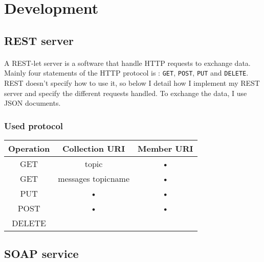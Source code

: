 \section{Development}

\subsection{REST server}

\paragraph{}{
	A REST-let server is a software that handle HTTP requests to exchange data. Mainly four
 statements of the HTTP protocol is : \texttt{GET}, \texttt{POST}, \texttt{PUT} and
 \texttt{DELETE}. REST doesn't specify how to use it, so below I detail how I implement my
 REST server and specify the different requests handled. To exchange the data, I use JSON
 documents.
}

\subsubsection{Used protocol}


\begin{tabular}{|c|c|c|}
\hline 
Operation & Collection URI & Member URI \\ 
\hline 
GET & topic & • \\ 
GET & messages topicname & • \\ 
\hline 
PUT & • & • \\ 
\hline 
POST & • & • \\ 
\hline
DELETE & & \\
\hline 
\end{tabular} 

\subsection{SOAP service}

\subsubsection{}

